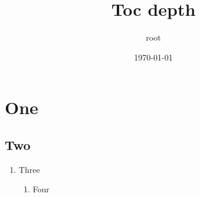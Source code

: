 \documentclass[11pt]{article}
\author{root}
\date{\today}
\title{Toc depth}
\begin{document}
\maketitle
\setcounter{tocdepth}{2}
\tableofcontents

\section{One}
\label{sec:org849e70f}
\subsection{Two}
\label{sec:org3e9e707}
\begin{enumerate}
\item Three
\label{sec:orgdc41f9b}
\begin{enumerate}
\item Four
\label{sec:orga23ca12}
\end{enumerate}
\end{enumerate}
\end{document}
